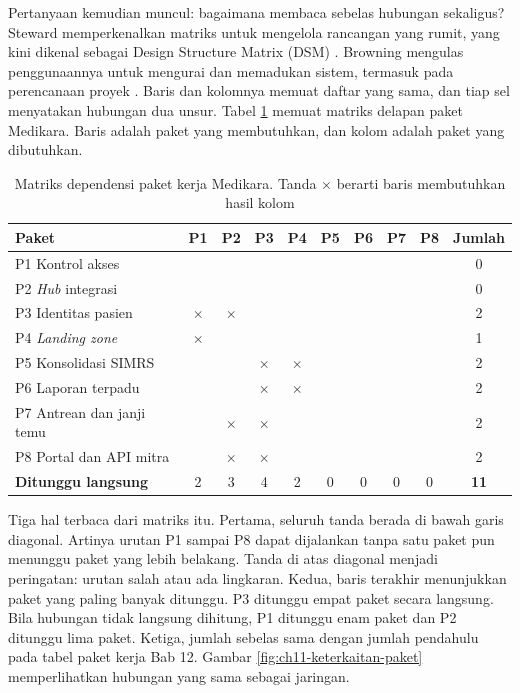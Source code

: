 Pertanyaan kemudian muncul: bagaimana membaca sebelas hubungan sekaligus? Steward memperkenalkan
matriks untuk mengelola rancangan yang rumit, yang kini dikenal sebagai Design Structure Matrix (DSM)
\cite{c11-steward1981}. Browning mengulas penggunaannya untuk mengurai dan memadukan sistem, termasuk
pada perencanaan proyek \cite{c11-browning2001}. Baris dan kolomnya memuat daftar yang sama, dan tiap
sel menyatakan hubungan dua unsur. Tabel \ref{tab:ch11-dsm} memuat matriks delapan paket Medikara. Baris
adalah paket yang membutuhkan, dan kolom adalah paket yang dibutuhkan.

\begin{table}[!htb]
  \centering
  \caption{Matriks dependensi paket kerja Medikara. Tanda $\times$ berarti baris membutuhkan hasil kolom}
  \label{tab:ch11-dsm}
  \small
  \begin{tabularx}{\textwidth}{>{\raggedright\arraybackslash}Xccccccccc}
    \hline
    \textbf{Paket} & \textbf{P1} & \textbf{P2} & \textbf{P3} & \textbf{P4} & \textbf{P5} & \textbf{P6} & \textbf{P7} & \textbf{P8} & \textbf{Jumlah} \\ \hline
    P1 Kontrol akses & & & & & & & & & 0 \\ \hline
    P2 \textit{Hub} integrasi & & & & & & & & & 0 \\ \hline
    P3 Identitas pasien & $\times$ & $\times$ & & & & & & & 2 \\ \hline
    P4 \textit{Landing zone} & $\times$ & & & & & & & & 1 \\ \hline
    P5 Konsolidasi SIMRS & & & $\times$ & $\times$ & & & & & 2 \\ \hline
    P6 Laporan terpadu & & & $\times$ & $\times$ & & & & & 2 \\ \hline
    P7 Antrean dan janji temu & & $\times$ & $\times$ & & & & & & 2 \\ \hline
    P8 Portal dan API mitra & & $\times$ & $\times$ & & & & & & 2 \\ \hline
    \textbf{Ditunggu langsung} & 2 & 3 & 4 & 2 & 0 & 0 & 0 & 0 & \textbf{11} \\ \hline
  \end{tabularx}
\end{table}

Tiga hal terbaca dari matriks itu. Pertama, seluruh tanda berada di bawah garis diagonal. Artinya urutan
P1 sampai P8 dapat dijalankan tanpa satu paket pun menunggu paket yang lebih belakang. Tanda di atas
diagonal menjadi peringatan: urutan salah atau ada lingkaran. Kedua, baris terakhir menunjukkan paket yang
paling banyak ditunggu. P3 ditunggu empat paket secara langsung. Bila hubungan tidak langsung dihitung, P1
ditunggu enam paket dan P2 ditunggu lima paket. Ketiga, jumlah sebelas sama dengan jumlah pendahulu pada
tabel paket kerja Bab 12. Gambar \ref{fig:ch11-keterkaitan-paket} memperlihatkan hubungan yang sama sebagai
jaringan.

